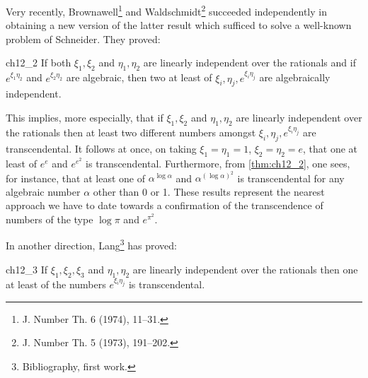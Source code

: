 Very recently, Brownawell\footnote{J. Number Th. 6 (1974), 11--31.} and Waldschmidt\footnote{J. Number Th. 5 (1973), 191--202.} succeeded independently in obtaining a new version of the latter result which sufficed to solve a well-known problem of Schneider. They proved:

\begin{mythm}{}{ch12_2}
If both $\xi_1, \xi_2$ and $\eta_1, \eta_2$ are linearly independent over the rationals and if $e^{\xi_1\eta_2}$ and $e^{\xi_2\eta_2}$ are algebraic, then two at least of $\xi_i, \eta_j, e^{\xi_i\eta_j}$ are algebraically independent.
\end{mythm}

This implies, more especially, that if $\xi_1, \xi_2$ and $\eta_1, \eta_2$ are linearly independent over the rationals then at least two different numbers amongst $\xi_i, \eta_j, e^{\xi_i\eta_j}$ are transcendental. It follows at once, on taking $\xi_1 = \eta_1 = 1$, $\xi_2 = \eta_2 = e$, that one at least of $e^e$ and $e^{e^2}$ is transcendental. Furthermore, from \autoref{thm:ch12_2}, one sees, for instance, that at least one of $\alpha^{\log \alpha}$ and $\alpha^{(\log \alpha)^2}$ is transcendental for any algebraic number $\alpha$ other than 0 or 1. These results represent the nearest approach we have to date towards a confirmation of the transcendence of numbers of the type $\log \pi$ and $e^{\pi^2}$.

In another direction, Lang\footnote{Bibliography, first work.} has proved:

\begin{mythm}{}{ch12_3}
If $\xi_1, \xi_2, \xi_3$ and $\eta_1, \eta_2$ are linearly independent over the rationals then one at least of the numbers $e^{\xi_i\eta_j}$ is transcendental.
\end{mythm}

